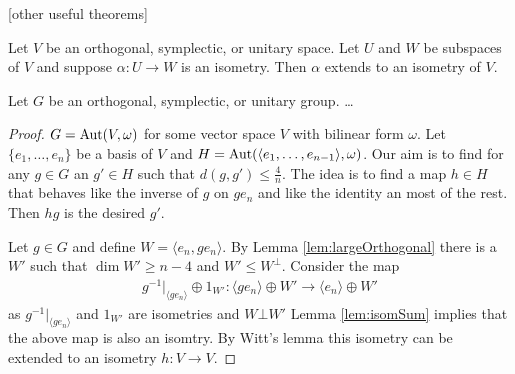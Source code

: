 [other useful theorems]


\begin{theorem}[Witt]
Let $V$ be an orthogonal, symplectic, or unitary space. Let $U$ and $W$ be subspaces of $V$ and suppose $\alpha\colon U\to W$ is an isometry. Then $\alpha$ extends to an isometry of $V$.
\end{theorem}

\begin{lemma}
Let $G$ be an orthogonal, symplectic, or unitary group. \dots
\end{lemma}
\begin{proof}
$G=\operatorname{Aut}(V,\omega)$ for some vector space $V$ with  bilinear form $\omega$. Let $\{e_1,\dots,e_n\}$ be a basis of $V$ and $H=\operatorname{Aut}(\langle e_1,\dots,e_{n-1}\rangle,\omega)$. Our aim is to find for any $g\in G$ an $g'\in H$ such that $d(g,g')\leq\frac{4}{n}$.
The idea is to find a map $h\in H$ that behaves like the inverse of $g$ on $ge_n$ and like the identity an most of the rest. Then $hg$ is the desired $g'$.

Let $g\in G$ and define $W=\langle e_n,ge_n\rangle$. By Lemma \ref{lem:largeOrthogonal} there is a $W'$ such that $\dim W'\geq n-4$ and $W'\leq W^\bot$. Consider the map
\begin{align*}
 g^{-1}|_{\langle ge_n\rangle}\oplus 1_{W'}\colon \langle ge_n\rangle\oplus W'\to \langle e_n\rangle\oplus W'
\end{align*}
as $g^{-1}|_{\langle ge_n\rangle}$ and $1_{W'}$ are isometries and $W\bot W'$ Lemma \ref{lem:isomSum} implies that the above map is also an isomtry. By Witt's lemma this isometry can be extended to an isometry $h\colon V\to V$.
\end{proof}